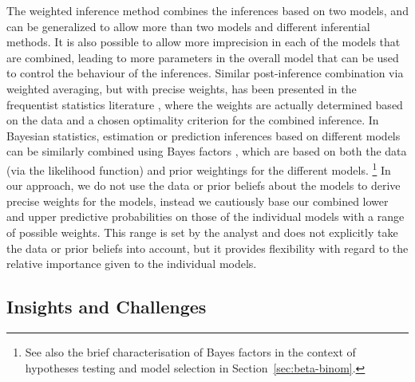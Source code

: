 The weighted inference method combines the inferences based on two
models, and can be generalized to allow more than two models and
different inferential methods. It is also possible to allow more
imprecision in each of the models that are combined, leading to more
parameters in the overall model that can be used to control the
behaviour of the inferences. Similar post-inference combination via
weighted averaging, but with precise weights, has been presented in the
frequentist statistics literature \parencite{2003:hjort,2003:longford}, where the
weights are actually determined based on the data and a chosen
optimality criterion for the combined inference. In Bayesian
statistics, estimation or prediction inferences based on different
models can be similarly combined using Bayes factors \parencite{1995:kass-raftery},
which are based on both the data (via the likelihood function) and
prior weightings for the different models.%
\footnote{See also the brief characterisation of Bayes factors
in the context of hypotheses testing and model selection in Section~\ref{sec:beta-binom}.}
In our approach, we do not use the data or prior beliefs about the models to derive precise
weights for the models, instead we cautiously base our combined
lower and upper predictive probabilities on those of the individual
models with a range of possible weights. This range is set by the
analyst and does not explicitly take the data or prior beliefs into
account, but it provides flexibility with regard to the relative
importance given to the individual models.


\subsection{Insights and Challenges}
\label{sec:insights}

